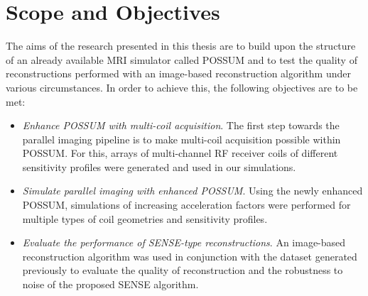 \section{Scope and Objectives}

The aims of the research presented in this thesis are to build upon the structure of an already available  MRI simulator called POSSUM and to test the quality of reconstructions performed with an image-based reconstruction algorithm under various circumstances. In order to achieve this, the following objectives are to be met:

\begin{itemize}
    \item \textit{Enhance POSSUM with multi-coil acquisition}. The first step towards the parallel imaging pipeline is to make multi-coil acquisition possible within POSSUM. For this, arrays of multi-channel RF receiver coils of different sensitivity profiles were generated and used in our simulations. 
    
    \item \textit{Simulate parallel imaging with enhanced POSSUM}. Using the newly enhanced POSSUM, simulations of increasing acceleration factors were performed for multiple types of coil geometries and sensitivity profiles.
    
    \item \textit{Evaluate the performance of SENSE-type reconstructions}. An image-based reconstruction algorithm was used in conjunction with the dataset generated previously to evaluate the quality of reconstruction and the robustness to noise of the proposed SENSE algorithm.
    
    

\end{itemize}

